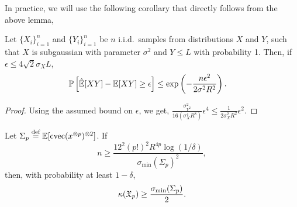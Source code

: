 \documentclass[tablecaption=bottom]{jmlr}
\newcommand\eqdef{\ensuremath{\stackrel{\textrm{def}}{=}}} %
\newcommand\sigmamin{\sigma_\textrm{min}}
\DeclareMathOperator{\cvec} {cvec}
\begin{document}
In practice, we will use the following corollary that directly follows from the above lemma,
\begin{corollary}
  Let $\{X_i\}_{i=1}^n$ and $\{Y_i\}_{i=1}^n$ be $n$ i.i.d.\
  samples from distributions $X$ and $Y$, such that $X$ is subgaussian with parameter
  $\sigma^2$ and $Y \le L$ with probability 1. Then, if $\epsilon \le 4\sqrt{2} \sigma_X L$,
  \begin{align}
    \mathbb{P}\left[ \hat{\operatorname{\mathbb{E}}}[ X Y ] - \operatorname{\mathbb{E}}[ X Y ] \ge \epsilon \right] 
    &\le \exp\left( - \frac{n \epsilon^2}{2 \sigma^2 R^2 } \right).
  \end{align}
\end{corollary}
\begin{proof}
  Using the assumed bound on $\epsilon$, we get,
  $\frac{\sigma^2_{Y^2}}{16 (\sigma^4_X R^8)} \epsilon^{4} \le \frac{1}{2\sigma^2_X R^2} \epsilon^{2}$.
\end{proof}

\begin{lemma}
\label{lem:lowRankLower}
Let $\Sigma_p \eqdef \E[\cvec(x\tp{p})\tp{2}]$.
If $$n \ge \frac{12^2 (p!)^2 R^{4p} \log(1/\delta)}{\sigmamin(\Sigma_p)^2},$$
then, with probability at least $1-\delta$,
$$\kappa(\opX_p) \ge \frac{\sigmamin(\Sigma_p)}{2}.$$
\end{lemma}
\end{document}
